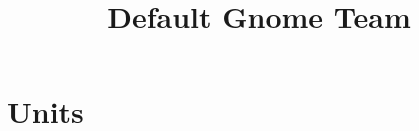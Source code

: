 \documentclass[a4,12pt, color, hyperref]{book}
\title{Default Gnome Team}
\begin{document}
\chapter{Units}

\end{document}

